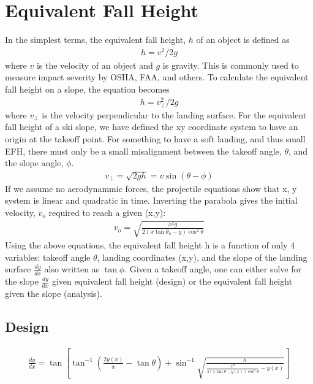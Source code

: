 \documentclass{article}
\begin{document}
\section{Equivalent Fall Height}
%
In the simplest terms, the equivalent fall height, $h$ of an object is defined
as
\begin{align}
  h = v^2/2g
  \label{eq:efh_general}
\end{align}
where $v$ is the velocity of an object and $g$ is gravity. This is commonly
used to measure impact severity by OSHA, FAA, and others. To calculate the
equivalent fall height on a slope, the equation becomes
\begin{align}
  h = v_{\perp}^2/2g
  \label{eq:efh_slope}
\end{align}
where $v_{\perp}$ is the velocity perpendicular to the landing surface. For the
equivalent fall height of a ski slope, we have defined the xy coordinate system
to have an origin at the takeoff point. For something to have a soft landing,
and thus small EFH, there must only be a small misalignment between the takeoff
angle, $\theta$, and the slope angle, $\phi$.
\begin{align}
  v_{\perp} = \sqrt{2gh} = v\sin(\theta - \phi)
\end{align}
If we assume no aerodynammic forces, the projectile equations show that x, y
system is linear and quadratic in time. Inverting the parabola gives the
initial velocity, $v_o$ required to reach a given (x,y):
\begin{align}
  v_o = \sqrt{\frac{x^2g}{2(x \tan \theta_o -y)\cos^{2}\theta}}
\end{align}
Using the above equations, the equivalent fall height h is a function of only 4
variables: takeoff angle $\theta$, landing coordinates (x,y), and the slope of
the landing surface $\frac{dy}{dx}$ also written as $\tan\phi$. Given a takeoff
angle, one can either solve for the slope $\frac{dy}{dx}$ given equivalent fall
height (design) or the equivalent fall height given the slope (analysis).

\subsection{Design}

\begin{align}
  \frac{dy}{dx} = \tan\left[\tan^{-1}(\frac{2y(x)}{x} - \tan\theta) +
    \sin^{-1}\sqrt{\frac{h}{\frac{x^2}{4(x\tan\theta -
    y(x))\cos^{2}\theta} - y(x)}}\right]
\end{align}
\end{document}

